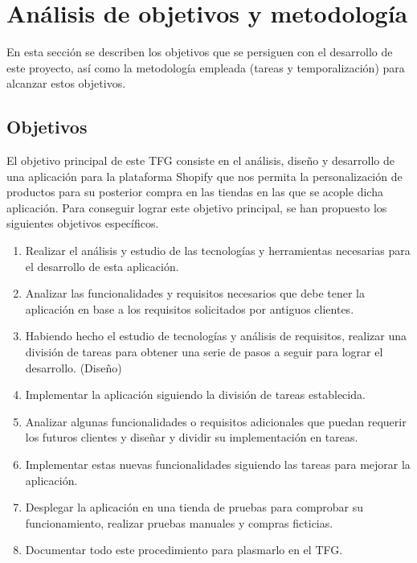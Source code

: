 \documentclass[12pt]{article}
\begin{document}
\newpage
\section{Análisis de objetivos y metodología}
En esta sección se describen los objetivos que se persiguen con el desarrollo de este proyecto, así como la metodología empleada (tareas y temporalización) para alcanzar estos objetivos.

\subsection{Objetivos}

El objetivo principal de este TFG consiste en el análisis, diseño y desarrollo de una aplicación para la plataforma Shopify que nos permita
la personalización de productos para su posterior compra en las tiendas en las que se acople dicha aplicación. Para conseguir lograr este objetivo 
principal, se han propuesto los siguientes objetivos específicos.

\begin{enumerate}
    \item Realizar el análisis y estudio de las tecnologías y herramientas necesarias para el desarrollo de esta aplicación. \label{item:objetivo1}
    \item Analizar las funcionalidades y requisitos necesarios que debe tener la aplicación en base a los requisitos solicitados por antiguos clientes. \label{item:objetivo2}
    \item Habiendo hecho el estudio de tecnologías y análisis de requisitos, realizar una división de tareas para obtener una serie de pasos a seguir para lograr el desarrollo. (Diseño) \label{item:objetivo3}
    \item Implementar la aplicación siguiendo la división de tareas establecida. \label{item:objetivo4}
    \item Analizar algunas funcionalidades o requisitos adicionales que puedan requerir los futuros clientes y diseñar y dividir su implementación en tareas. \label{item:objetivo5}
    \item Implementar estas nuevas funcionalidades siguiendo las tareas para mejorar la aplicación. \label{item:objetivo6}
    \item Desplegar la aplicación en una tienda de pruebas para comprobar su funcionamiento, realizar pruebas manuales y compras ficticias. \label{item:objetivo7}
    \item Documentar todo este procedimiento para plasmarlo en el TFG. \label{item:objetivo8}
\end{enumerate}
\end{document}
